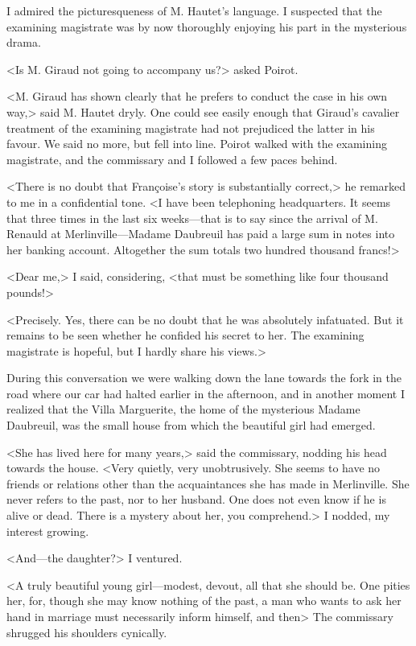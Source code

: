  I admired the picturesqueness of M. Hautet's language. I suspected that the examining magistrate was by now thoroughly enjoying his part in the mysterious drama. 

 <Is M. Giraud not going to accompany us?> asked Poirot. 

 <M. Giraud has shown clearly that he prefers to conduct the case in his own way,> said M. Hautet dryly. One could see easily enough that Giraud's cavalier treatment of the examining magistrate had not prejudiced the latter in his favour. We said no more, but fell into line. Poirot walked with the examining magistrate, and the commissary and I followed a few paces behind. 

 <There is no doubt that Françoise's story is substantially correct,> he remarked to me in a confidential tone. <I have been telephoning headquarters. It seems that three times in the last six weeks—that is to say since the arrival of M. Renauld at Merlinville—Madame Daubreuil has paid a large sum in notes into her banking account. Altogether the sum totals two hundred thousand francs!> 

 <Dear me,> I said, considering, <that must be something like four thousand pounds!> 

 <Precisely. Yes, there can be no doubt that he was absolutely infatuated. But it remains to be seen whether he confided his secret to her. The examining magistrate is hopeful, but I hardly share his views.> 

 During this conversation we were walking down the lane towards the fork in the road where our car had halted earlier in the afternoon, and in another moment I realized that the Villa Marguerite, the home of the mysterious Madame Daubreuil, was the small house from which the beautiful girl had emerged. 

 <She has lived here for many years,> said the commissary, nodding his head towards the house. <Very quietly, very unobtrusively. She seems to have no friends or relations other than the acquaintances she has made in Merlinville. She never refers to the past, nor to her husband. One does not even know if he is alive or dead. There is a mystery about her, you comprehend.> I nodded, my interest growing. 

 <And—the daughter?> I ventured. 

 <A truly beautiful young girl—modest, devout, all that she should be. One pities her, for, though she may know nothing of the past, a man who wants to ask her hand in marriage must necessarily inform himself, and then\longdash> The commissary shrugged his shoulders cynically. 

